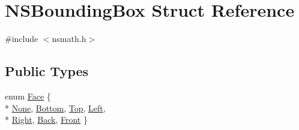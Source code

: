 \hypertarget{structNSBoundingBox}{\section{N\-S\-Bounding\-Box Struct Reference}
\label{structNSBoundingBox}
}


{\ttfamily \#include $<$nsmath.\-h$>$}

\subsection*{Public Types}
\begin{DoxyCompactItemize}
\item 
enum \hyperlink{structNSBoundingBox_a6cc652314d1c87dcedda3eaa21f1d3e3}{Face} \{ \\*
\hyperlink{structNSBoundingBox_a6cc652314d1c87dcedda3eaa21f1d3e3a745378f1b978fbeb020a885e0b12282a}{None}, 
\hyperlink{structNSBoundingBox_a6cc652314d1c87dcedda3eaa21f1d3e3aaad0448696f53765901c258077228bbd}{Bottom}, 
\hyperlink{structNSBoundingBox_a6cc652314d1c87dcedda3eaa21f1d3e3a7f46147c511698a1073663c686687fa6}{Top}, 
\hyperlink{structNSBoundingBox_a6cc652314d1c87dcedda3eaa21f1d3e3a9803c369ffa46e5be767f351b1eac244}{Left}, 
\\*
\hyperlink{structNSBoundingBox_a6cc652314d1c87dcedda3eaa21f1d3e3ad6fa2c54fe36df795e203490cb5d33cd}{Right}, 
\hyperlink{structNSBoundingBox_a6cc652314d1c87dcedda3eaa21f1d3e3aa3210f70f334d5ee24a72182b94999cd}{Back}, 
\hyperlink{structNSBoundingBox_a6cc652314d1c87dcedda3eaa21f1d3e3aac9f5dea31ead073b4675ee3978b0c5f}{Front}
 \}
\end{DoxyCompactItemize}

